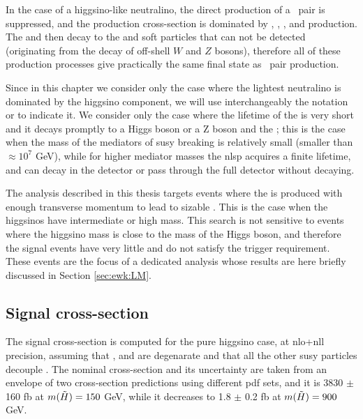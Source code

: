 In the case of a higgsino-like neutralino, the direct production of a \ninoone\ninoone\ pair is suppressed, and the production cross-section is dominated by 
\ninoone\ninotwo, \ninoone\chinoonepm, \ninotwo\chinoonepm, and \chinoonep\chinoonem production.
The \ninotwo and \chinoonepm then decay to the \ninoone and soft particles that can not be detected (originating from the 
decay of off-shell $W$ and $Z$ bosons), therefore all of these production processes give practically the same final state as 
\ninoone\ninoone\  pair production. 

Since in this chapter we consider only the case where the lightest neutralino is dominated by the higgsino component,
we will use interchangeably the notation \ninoone or \hino to indicate it.  
We consider only the case where the lifetime of the \hino is very short and it decays promptly to a Higgs boson or a Z boson and the \gravino;
this is the case when the mass of the mediators of \gls{susy} breaking is relatively small (smaller than $\approx 10^7$ GeV), 
while for higher mediator masses the \gls{nlsp} acquires a finite lifetime, and can decay in the detector or pass
 through the full detector without decaying. 

The analysis described in this thesis targets events where the \gravino is produced with enough transverse momentum to lead to 
sizable \met. This is the case when the higgsinos have intermediate or high mass.
This search is not sensitive to events where the higgsino mass is close to the mass of the Higgs boson, and therefore 
the signal events have very little \met and do not satisfy the \met trigger requirement.
These events are the focus of a dedicated analysis whose results are here briefly discussed in Section \ref{sec:ewk:LM}.


\subsection{Signal cross-section}

The signal cross-section is computed for the pure higgsino case, at \gls{nlo}+\gls{nll} precision, assuming that
\ninoone, \ninotwo and \chinoonepm are degenarate and that all the other \gls{susy} particles decouple \cite{Fuks:2012qx,Fuks:2013vua}.
The nominal cross-section and its uncertainty are taken from an envelope of two cross-section predictions using different \gls{pdf} sets, 
and it is 3830 $\pm$ 160 fb at $m(\tilde{H}) = 150$ GeV, while it decreases to 1.8 $\pm$ 0.2 fb at $m(\tilde{H}) = 900$ GeV. 

